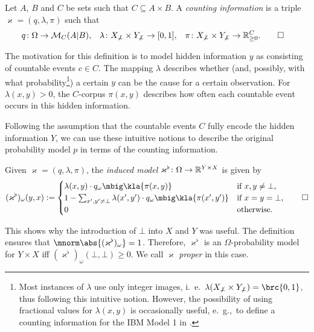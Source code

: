 \begin{definition}
 Let $A$, $B$ and $C$ be sets such that $C\subseteq A\times B$. A
 \emph{counting information} is a triple $\varkappa = (q,\lambda,\pi)$ such
 that
 \begin{align*}
  q &\colon \Omega\to\mathcal M_C(A|B), &
  \lambda &\colon X_{\not\bot} \times Y_{\not\bot} \to [0,1], &
  \pi &\colon X_{\not\bot} \times Y_{\not\bot} \to \mathbb R_{\geq0}^C.
  \qedhere
 \end{align*}
\end{definition}

The motivation for this definition is to model hidden information $y$ as
consisting of countable events $c\in C$. The mapping $\lambda$ describes
whether (and, possibly, with what probability\footnote{Most instances of
$\lambda$ use only integer images, i.~e.~$\lambda(X_{\not\bot}\times
Y_{\not\bot}) = \brc{0,1}$, thus following this intuitive notion. However, the
possibility of using fractional values for $\lambda(x,y)$ is occasionally
useful, e.~g.,~to define a counting information for the IBM Model 1 in
\cite[pp.~23]{bucstuvog15}.}) a certain $y$ can be the cause for a certain
observation. For $\lambda(x,y)>0$, the $C$-corpus $\pi(x,y)$ describes how
often each countable event occurs in this hidden information.

Following the assumption that the countable events $C$ fully encode the hidden
information $Y$, we can use these intuitive notions to describe the original
probability model $p$ in terms of the counting information.

\pagebreak
\begin{definition}
 Given $\varkappa=(q,\lambda,\pi)$, the \emph{induced model}
 $\varkappa^\flat\colon\Omega\to\mathbb R^{Y\times X}$ is given by
 \[
  (\varkappa^\flat)_\omega(y,x) := \begin{cases}
   \lambda(x,y) \cdot q_\omega\mbig\kla{\pi(x,y)} & \text{if } x,y\neq\bot, \\
   1 - \sum_{x',y'\neq\bot} \lambda(x',y') \cdot q_\omega\mbig\kla{\pi(x',y')} & \text{if } x = y = \bot, \\
   0 & \text{otherwise}.
  \end{cases}\qedhere
 \]
\end{definition}

This shows why the introduction of $\bot$ into $X$ and $Y$ was useful. The
definition ensures that $\mnorm\abs{(\varkappa^\flat)_\omega} = 1$. Therefore,
$\varkappa^\flat$ is an $\Omega$-probability model for $Y\times X$ iff
$(\varkappa^\flat)_\omega(\bot,\bot) \geq 0$. We call $\varkappa$ \emph{proper}
in this case.

